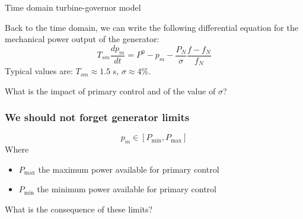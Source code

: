 \begin{frame}{Time domain turbine-governor model}

    Back to the time domain, we can write the following differential equation for the mechanical power output of the generator:
    $$T_{sm} \frac{d p_m}{dt} = P^0 - p_m - \frac{P_{N}}{\sigma}\frac{f-f_N}{f_N}$$
    Typical values are: $T_{sm} \approx 1.5 $ s, $\sigma \approx 4\%$.

    \begin{block}{What is the impact of primary control and of the value of $\sigma$?}
      \vspace*{1cm}
    \end{block}

    
\end{frame}

\begin{frame}
    \frametitle{We should not forget generator limits}
    $$p_m \in [P_{\min}, P_{\max}]$$
    Where
    \begin{itemize}
        \item $P_{\max}$ the maximum power available for primary control
        \item $P_{\min}$ the minimum power available for primary control
    \end{itemize}

    \begin{block}{What is the consequence of these limits?}
      \vspace*{1cm}
    \end{block}

\end{frame}

